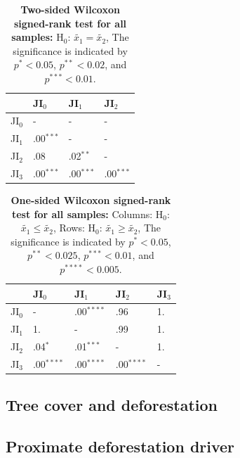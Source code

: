 			\begin{table}[ht]
				\centering
				\caption[Two-sided Wilcoxon signed-rank test for all samples]{\textbf{Two-sided Wilcoxon signed-rank test for all samples:} H$_0$: $\tilde{x_1}=\tilde{x_2}$, The significance is indicated by $p^{*}<0.05$, $p^{**}<0.02$, and $p^{***}<0.01$.}
				\label{tab:wilcoxontwosided_all}
				\begin{tabular}{llll}
					\hline
					& JI$_0$ & JI$_1$ & JI$_2$ \\\hline
					JI$_0$ & - & - & - \\
					JI$_1$ & .00$^{***}$ & - & - \\
					JI$_2$ & .08 & .02$^{**}$ & - \\
					JI$_3$ & .00$^{***}$ & .00$^{***}$ & .00$^{***}$ \\\hline
				\end{tabular}
			\end{table}
			\begin{table}[ht]
				\centering
				\caption[One-sided Wilcoxon signed-rank test fro all samples]{\textbf{One-sided Wilcoxon signed-rank test for all samples:} Columns: H$_0$: $\tilde{x_1}\leq\tilde{x_2}$, Rows: H$_0$: $\tilde{x_1}\geq\tilde{x_2}$, The significance is indicated by $p^{*}<0.05$, $p^{**}<0.025$, $p^{***}<0.01$, and $p^{****}<0.005$.}
				\label{tab:wilcoxononesided_all}
				\begin{tabular}{lllll}
					\hline
					& JI$_0$ & JI$_1$ & JI$_2$ & JI$_3$ \\\hline
					JI$_0$ & - & .00$^{****}$ & .96 & 1. \\
					JI$_1$ & 1. & - & .99 & 1. \\
					JI$_2$ & .04$^{*}$ & .01$^{***}$ & - & 1. \\
					JI$_3$ & .00$^{****}$ & .00$^{****}$ & .00$^{****}$ & - \\\hline
				\end{tabular}
			\end{table}

		\subsection{Tree cover and deforestation}
		\label{subsec:results_tree_cover_and_deforestation}

		\subsection{Proximate deforestation driver}
		\label{subsec:results_proxy_deforestation_driver}

